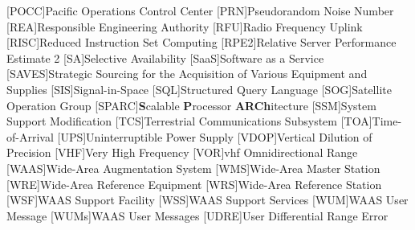 \begin{acronym}[WAAS]
[POCC]{Pacific Operations Control Center}
[PRN]{Pseudorandom Noise Number}
[REA]{Responsible Engineering Authority}
[RFU]{Radio Frequency Uplink}
[RISC]{Reduced Instruction Set Computing}
[RPE2]{Relative Server Performance Estimate 2}
[SA]{Selective Availability}
[SaaS]{Software as a Service}
[SAVES]{Strategic Sourcing for the Acquisition of Various Equipment and Supplies}
[SIS]{Signal-in-Space}
[SQL]{Structured Query Language}
[SOG]{Satellite Operation Group}
[SPARC]{\textbf{S}calable \textbf{P}rocessor \textbf{ARCh}itecture}
[SSM]{System Support Modification}
[TCS]{Terrestrial Communications Subsystem}
[TOA]{Time-of-Arrival}
[UPS]{Uninterruptible Power Supply}
[VDOP]{Vertical Dilution of Precision}
[VHF]{Very High Frequency}
[VOR]{\ac{vhf} Omnidirectional Range}
[WAAS]{Wide-Area Augmentation System}
[WMS]{Wide-Area Master Station}
[WRE]{Wide-Area Reference Equipment}
[WRS]{Wide-Area Reference Station}
[WSF]{WAAS Support Facility}
[WSS]{WAAS Support Services}
[WUM]{WAAS User Message}
[WUMs]{WAAS User Messages}
[UDRE]{User Differential Range Error}
\end{acronym}
